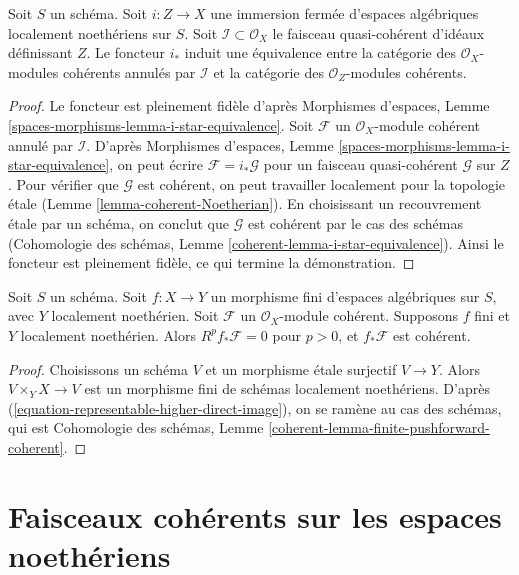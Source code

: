 \begin{lemma}
\label{lemma-i-star-equivalence}
Soit $S$ un schéma. Soit $i : Z \to X$ une immersion fermée d'espaces
algébriques localement noethériens sur $S$.
Soit $\mathcal{I} \subset \mathcal{O}_X$ le faisceau quasi-cohérent d'idéaux
définissant $Z$. Le foncteur $i_*$ induit une équivalence entre la
catégorie des $\mathcal{O}_X$-modules cohérents annulés par $\mathcal{I}$
et la catégorie des $\mathcal{O}_Z$-modules cohérents.
\end{lemma}

\begin{proof}
Le foncteur est pleinement fidèle d'après
Morphismes d'espaces, Lemme \ref{spaces-morphisms-lemma-i-star-equivalence}.
Soit $\mathcal{F}$ un $\mathcal{O}_X$-module cohérent
annulé par $\mathcal{I}$. D'après
Morphismes d'espaces, Lemme \ref{spaces-morphisms-lemma-i-star-equivalence},
on peut écrire $\mathcal{F} = i_*\mathcal{G}$ pour un faisceau quasi-cohérent
$\mathcal{G}$ sur $Z$. Pour vérifier que $\mathcal{G}$ est cohérent,
on peut travailler localement pour la topologie \'etale (Lemme \ref{lemma-coherent-Noetherian}).
En choisissant un recouvrement \'etale par un schéma, on conclut que
$\mathcal{G}$ est cohérent par le cas des schémas
(Cohomologie des schémas, Lemme \ref{coherent-lemma-i-star-equivalence}).
Ainsi le foncteur est pleinement fidèle, ce qui termine la démonstration.
\end{proof}

\begin{lemma}
\label{lemma-finite-pushforward-coherent}
Soit $S$ un schéma. Soit $f : X \to Y$ un morphisme fini d'espaces
algébriques sur $S$, avec $Y$ localement noethérien. Soit $\mathcal{F}$ un
$\mathcal{O}_X$-module cohérent. Supposons $f$ fini et $Y$ localement
noethérien. Alors $R^pf_*\mathcal{F} = 0$ pour $p > 0$, et
$f_*\mathcal{F}$ est cohérent.
\end{lemma}

\begin{proof}
Choisissons un schéma $V$ et un morphisme \'etale surjectif $V \to Y$.
Alors $V \times_Y X \to V$ est un morphisme fini de schémas localement
noethériens. D'après (\ref{equation-representable-higher-direct-image}), on se ramène
au cas des schémas, qui est
Cohomologie des schémas, Lemme \ref{coherent-lemma-finite-pushforward-coherent}.
\end{proof}






\section{Faisceaux cohérents sur les espaces noethériens}
\label{section-coherent-quasi-compact}

